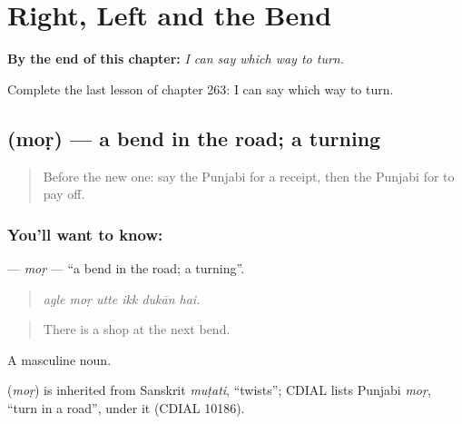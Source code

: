 
\chapter{Right, Left and the Bend}
\label{ch:pa-a2-right-left-and-the-bend}

\begin{chapteropening}
\textbf{By the end of this chapter:} \emph{I can say which way to turn.}

Complete the last lesson of chapter 263: I can say which way to turn.
\end{chapteropening}

\section[\texorpdfstring{\pa{ਮੋੜ} (moṛ)}{ਮੋੜ (moṛ)}]{ (moṛ) — a bend in the road; a turning}

\label{lesson:PA-C263-mor}



\begin{quote}
Before the new one: say the Punjabi for a receipt, then the Punjabi for to pay off.
\end{quote}

\subsection*{You'll want to know: }
\textbf{} — \emph{moṛ} — \textquotedblleft{}a bend in the road; a turning\textquotedblright{}.

\begin{quote}
     
\end{quote}

\begin{quote}
\emph{agle moṛ utte ikk dukān hai.}
\end{quote}

\begin{quote}
There is a shop at the next bend.
\end{quote}

A masculine noun.

\begin{cousinweb}
\textbf{} (\emph{moṛ}) is inherited from Sanskrit \emph{muṭati}, \textquotedblleft{}twists\textquotedblright{}; CDIAL lists Punjabi \emph{moṛ}, \textquotedblleft{}turn in a road\textquotedblright{}, under it (CDIAL 10186).
\end{cousinweb}

